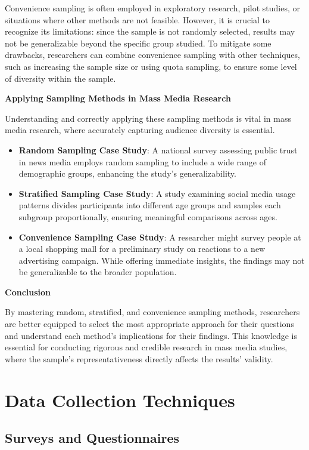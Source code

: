 \documentclass[
]{book}
\begin{document}
Convenience sampling is often employed in exploratory research, pilot studies, or situations where other methods are not feasible. However, it is crucial to recognize its limitations: since the sample is not randomly selected, results may not be generalizable beyond the specific group studied. To mitigate some drawbacks, researchers can combine convenience sampling with other techniques, such as increasing the sample size or using quota sampling, to ensure some level of diversity within the sample.

\textbf{Applying Sampling Methods in Mass Media Research}

Understanding and correctly applying these sampling methods is vital in mass media research, where accurately capturing audience diversity is essential.

\begin{itemize}
\item
  \textbf{Random Sampling Case Study}: A national survey assessing public trust in news media employs random sampling to include a wide range of demographic groups, enhancing the study's generalizability.
\item
  \textbf{Stratified Sampling Case Study}: A study examining social media usage patterns divides participants into different age groups and samples each subgroup proportionally, ensuring meaningful comparisons across ages.
\item
  \textbf{Convenience Sampling Case Study}: A researcher might survey people at a local shopping mall for a preliminary study on reactions to a new advertising campaign. While offering immediate insights, the findings may not be generalizable to the broader population.
\end{itemize}

\textbf{Conclusion}

By mastering random, stratified, and convenience sampling methods, researchers are better equipped to select the most appropriate approach for their questions and understand each method's implications for their findings. This knowledge is essential for conducting rigorous and credible research in mass media studies, where the sample's representativeness directly affects the results' validity.

\section{Data Collection Techniques}\label{data-collection-techniques}

\subsection*{Surveys and Questionnaires}\label{surveys-and-questionnaires}
\end{document}

